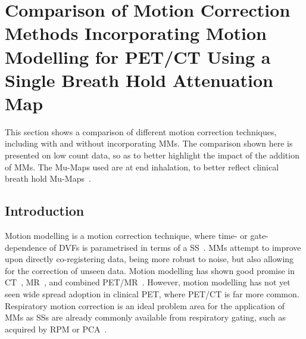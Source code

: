     \section{Comparison of Motion Correction Methods Incorporating Motion Modelling for PET/CT Using a Single Breath Hold Attenuation Map} \label{sec:comparison_of_motion_correction_methods_incorporating_motion_modelling_for_pet_ct_using_a_single_breath_hold_attenuation_map}
        This section shows a comparison of different motion correction techniques, including with and without incorporating \glspl{MM}. The comparison shown here is presented on low count data, so as to better highlight the impact of the addition of \glspl{MM}. The \glspl{Mu-Map} used are at end inhalation, to better reflect clinical breath hold \glspl{Mu-Map}~\parencite{Whitehead2021ComparisonMap}.
        
        \subsection{Introduction} \label{sec:comparison_of_motion_correction_methods_incorporating_motion_modelling_for_pet_ct_using_a_single_breath_hold_attenuation_map_introduction}
            Motion modelling is a motion correction technique, where time- or gate-dependence of \glspl{DVF} is parametrised in terms of a \gls{SS}~\parencite{McClelland2013}. \glspl{MM} attempt to improve upon directly co-registering data, being more robust to noise, but also allowing for the correction of unseen data. Motion modelling has shown good promise in \gls{CT}~\parencite{Li2007EnhancedModel}, \gls{MR}~\parencite{Manke2002RespiratoryModels}, and combined \gls{PET}/\gls{MR}~\parencite{Manber2016JointCorrection}. However, motion modelling has not yet seen wide spread adoption in clinical \gls{PET}, where \gls{PET}/\gls{CT} is far more common. Respiratory motion correction is an ideal problem area for the application of \glspl{MM} as \glspl{SS} are already commonly available from respiratory gating, such as acquired by \gls{RPM} or \gls{PCA}~\parencite{Thielemans2011}.
            

